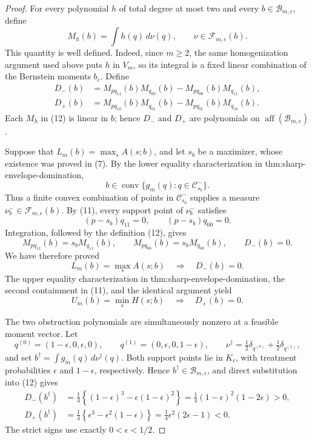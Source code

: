 \documentclass{article}
\begin{document}
\begin{proof}
For every polynomial \(h\) of total degree at most two and every
\(b\in\mathcal B_{m,\epsilon}\), define
\[
M_h(b)=\int h(q)\,d\nu(q),
\qquad \nu\in\mathcal F_{m,\epsilon}(b).
\]
This quantity is well defined. Indeed, since \(m\geq2\), the same
homogenization argument used above puts \(h\) in \(V_m\), so its integral is
a fixed linear combination of the Bernstein moments \(b_c\). Define
\[
\begin{aligned}
D_-(b)&=M_{p q_{11}}(b)M_{q_{00}}(b)
-M_{p q_{00}}(b)M_{q_{11}}(b),\\
D_+(b)&=M_{p q_{10}}(b)M_{q_{01}}(b)
-M_{p q_{01}}(b)M_{q_{10}}(b).
\end{aligned}                                                     \tag{12}
\]
Each \(M_h\) in (12) is linear in \(b\); hence \(D_-\) and \(D_+\) are
polynomials on \(\operatorname{aff}(\mathcal B_{m,\epsilon})\).

Suppose that
\(L_m(b)=\max_s A(s;b)\), and let \(s_b\) be a maximizer, whose existence
was proved in (7). By the lower equality characterization in
thm:sharp-envelope-domination,
\[
b\in\operatorname{conv}\{g_m(q):q\in\mathcal C_{s_b}^-\}.
\]
Thus a finite convex combination of points in \(\mathcal C_{s_b}^-\) supplies
a measure \(\nu_b^-\in\mathcal F_{m,\epsilon}(b)\). By (11), every support
point of \(\nu_b^-\) satisfies
\[
(p-s_b)q_{11}=0,
\qquad
(p-s_b)q_{00}=0.
\]
Integration, followed by the definition (12), gives
\[
M_{p q_{11}}(b)=s_bM_{q_{11}}(b),
\qquad
M_{p q_{00}}(b)=s_bM_{q_{00}}(b),
\qquad
D_-(b)=0.
\]
We have therefore proved
\[
L_m(b)=\max_s A(s;b)\quad\Longrightarrow\quad D_-(b)=0.           \tag{13}
\]
The upper equality characterization in thm:sharp-envelope-domination, the
second containment in (11), and the identical argument yield
\[
U_m(b)=\min_s H(s;b)\quad\Longrightarrow\quad D_+(b)=0.           \tag{14}
\]

The two obstruction polynomials are simultaneously nonzero at a feasible
moment vector. Let
\[
q^{(0)}=(1-\epsilon,0,\epsilon,0),
\qquad
q^{(1)}=(0,\epsilon,0,1-\epsilon),
\qquad
\nu^\dagger=\tfrac12\delta_{q^{(0)}}+\tfrac12\delta_{q^{(1)}},
\]
and set \(b^\dagger=\int g_m(q)\,d\nu^\dagger(q)\). Both support points lie
in \(K_{\epsilon}\), with treatment probabilities \(\epsilon\) and
\(1-\epsilon\), respectively. Hence
\(b^\dagger\in\mathcal B_{m,\epsilon}\), and direct substitution into (12)
gives
\[
\begin{aligned}
D_-(b^\dagger)
&=\frac14\left\{(1-\epsilon)^3-\epsilon(1-\epsilon)^2\right\}
=\frac14(1-\epsilon)^2(1-2\epsilon)>0,\\
D_+(b^\dagger)
&=\frac14\left\{\epsilon^3-\epsilon^2(1-\epsilon)\right\}
=\frac14\epsilon^2(2\epsilon-1)<0.                              \tag{15}
\end{aligned}
\]
The strict signs use exactly \(0<\epsilon<1/2\).


\end{proof}
\end{document}
